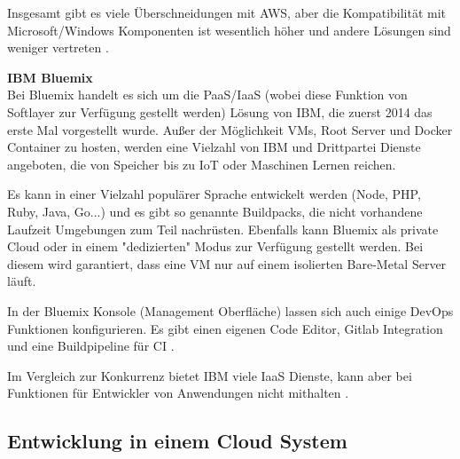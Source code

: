 Insgesamt gibt es viele Überschneidungen mit \acs{AWS}, aber die Kompatibilität mit Microsoft/Windows Komponenten ist wesentlich höher und andere Lösungen sind weniger vertreten \parencite{microsoft.2015}.


\textbf{IBM Bluemix}\\
Bei Bluemix handelt es sich um die \acs{PaaS}/\acs{IaaS} (wobei diese Funktion von Softlayer zur Verfügung gestellt werden) Lösung von IBM, die zuerst 2014 das erste Mal vorgestellt wurde. Außer der Möglichkeit \acs{VM}s, Root Server und Docker Container zu hosten, werden eine Vielzahl von IBM und Drittpartei Dienste angeboten, die von Speicher bis zu \acs{IoT} oder Maschinen Lernen reichen.

Es kann in einer Vielzahl populärer Sprache entwickelt werden (Node, PHP, Ruby, Java, Go...) und es gibt so genannte Buildpacks, die nicht vorhandene Laufzeit Umgebungen zum Teil nachrüsten. Ebenfalls kann Bluemix als private Cloud oder in einem "dedizierten" Modus zur Verfügung gestellt werden. Bei diesem wird garantiert, dass eine \acs{VM} nur auf einem isolierten Bare-Metal Server läuft.

In der Bluemix Konsole (Management Oberfläche) lassen sich auch einige \gls{DevOps} Funktionen konfigurieren. Es gibt einen eigenen Code Editor, Gitlab Integration und eine Buildpipeline für \ac{CI} \parencite{fassnacht.2016}.

Im Vergleich zur Konkurrenz bietet IBM viele \acs{IaaS} Dienste, kann aber bei Funktionen für Entwickler von Anwendungen nicht mithalten \parencite{computerwoche.2016}. 

\subsection{Entwicklung in einem Cloud System} 